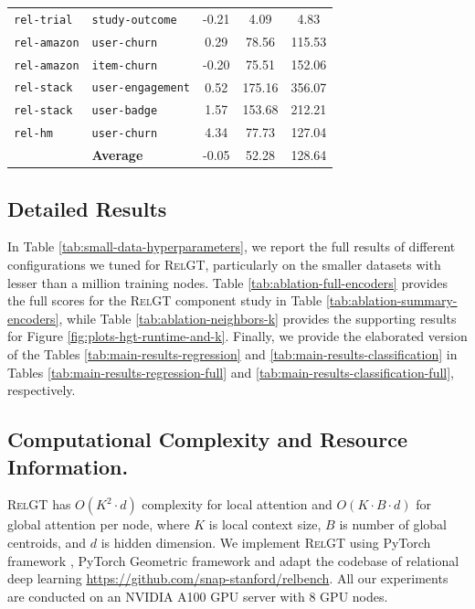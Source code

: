 \documentclass{article} %
\newcommand{\RelGT}{\textsc{RelGT}\xspace}
\begin{document}
\begin{table}[!t]
{\begin{tabular}{ll>{}S[table-format=-2.2]cc}
\texttt{rel-trial} & \texttt{study-outcome} & -0.21 & 4.09 & 4.83 \\
\texttt{rel-amazon} & \texttt{user-churn} & 0.29 & 78.56 & 115.53 \\
\texttt{rel-amazon} & \texttt{item-churn} & -0.20 & 75.51 & 152.06 \\
\texttt{rel-stack} & \texttt{user-engagement} & 0.52 & 175.16 & 356.07 \\
\texttt{rel-stack} & \texttt{user-badge} & 1.57 & 153.68 & 212.21 \\
\texttt{rel-hm} & \texttt{user-churn} & 4.34 & 77.73 & 127.04 \\
\midrule
& \textbf{Average} & -0.05 & 52.28 & 128.64\\
\bottomrule
\end{tabular}
}
\label{tab:runtime-hgt}
\end{table}






\subsection{Detailed Results}
In Table \ref{tab:small-data-hyperparameters}, we report the full results of different configurations we tuned for \RelGT, particularly on the smaller datasets with lesser than a million training nodes. Table \ref{tab:ablation-full-encoders} provides the full scores for the \RelGT component study in Table \ref{tab:ablation-summary-encoders}, while Table \ref{tab:ablation-neighbors-k} provides the supporting results for Figure \ref{fig:plots-hgt-runtime-and-k}. Finally, we provide the elaborated version of the Tables \ref{tab:main-results-regression} and \ref{tab:main-results-classification} in Tables \ref{tab:main-results-regression-full} and \ref{tab:main-results-classification-full}, respectively.


\subsection{Computational Complexity and Resource Information.}
\label{sec:resource}
\RelGT has $O(K^2 \cdot d)$ complexity for local attention and $O(K \cdot B \cdot d)$ for global attention per node, where $K$ is local context size, $B$ is number of global centroids, and $d$ is hidden dimension. We implement \RelGT using PyTorch framework \citep{paszke2019pytorch}, PyTorch Geometric framework \citep{fey2019fast} and adapt the codebase of relational deep learning \citep{robinson2025relbench} \url{https://github.com/snap-stanford/relbench}. All our experiments are conducted on an NVIDIA A100 GPU server with 8 GPU nodes.
\end{document}
